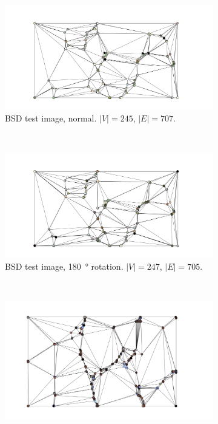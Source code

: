 \documentclass{mpaper}
\begin{document}
\begin{figure}
	\centering
	\begin{subfigure}[b]{0.22\textwidth}
		\includegraphics[width=\textwidth]{img-results/nrm}
		\caption{
				BSD test image, normal.
				$|V|=245$, $|E|=707$.
		}
		\label{fig:explor-bsdnrmgraph}
	\end{subfigure}
	~
	\begin{subfigure}[b]{0.22\textwidth}
		\includegraphics[width=\textwidth]{img-results/180}
		\caption{
				BSD test image, \SI{180}{\degree} rotation.
				$|V|=247$, $|E|=705$.
		}
		\label{fig:explor-bsd180graph}
	\end{subfigure}
	~
	\begin{subfigure}[b]{0.22\textwidth}
		\includegraphics[width=\textwidth]{img-results/gbu-smr2-graph}

\end{subfigure}
\end{figure}
\end{document}
